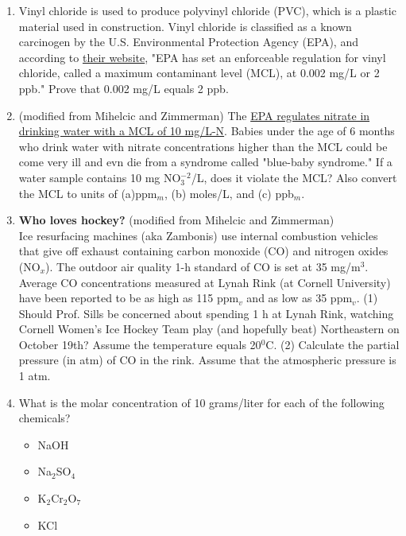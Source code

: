 \documentclass[12pt,letterpaper]{article}
\begin{document}
\begin{enumerate}
\item Vinyl chloride is used to produce polyvinyl chloride (PVC), which is a plastic material used in construction.  Vinyl chloride is classified as a known carcinogen by the U.S. Environmental Protection Agency (EPA), and according to \href{http://water.epa.gov/drink/contaminants/basicinformation/vinyl-chloride.cfm}{their website}, "EPA has set an enforceable regulation for vinyl chloride, called a maximum contaminant level (MCL), at 0.002 mg/L or 2 ppb."  Prove that 0.002 mg/L equals 2 ppb. 

\item (modified from Mihelcic and Zimmerman) The \href{http://water.epa.gov/drink/contaminants/basicinformation/vinyl-chloride.cfm}{EPA regulates nitrate in drinking water with a MCL of 10 mg/L-N}.  Babies under the age of 6 months who drink water with nitrate concentrations higher than the MCL could be come very ill and evn die from a syndrome called "blue-baby syndrome."  If a water sample contains 10 mg NO$_3^{-2}$/L, does it violate the MCL?  Also convert the MCL to units of (a)ppm$_m$, (b) moles/L, and (c) ppb$_m$. 

\item \textbf{Who loves hockey?} (modified from Mihelcic and Zimmerman)\\
Ice resurfacing machines (aka Zambonis) use internal combustion vehicles that give off exhaust containing carbon monoxide (CO) and nitrogen oxides (NO$_x$).  The outdoor air quality 1-h standard of CO is set at 35 mg/m$^3$. Average CO concentrations measured at Lynah Rink (at Cornell University) have been reported to be as high as 115 ppm$_v$ and as low as 35 ppm$_v$.  (1) Should Prof. Sills be concerned about spending 1 h at Lynah Rink, watching Cornell Women's Ice Hockey Team play (and hopefully beat) Northeastern on October 19th?  Assume the temperature equals 20$^0$C. (2) Calculate the partial pressure (in atm) of CO in the rink.  Assume that the atmospheric pressure is 1 atm.

\item What is the molar concentration of 10 grams/liter for each of the following chemicals?
\begin{itemize}
\item NaOH     
\item Na$_2$SO$_4$   
\item K$_2$Cr$_2$O$_7$   
\item KCl  
\end{itemize}


\end{enumerate}
\end{document}
